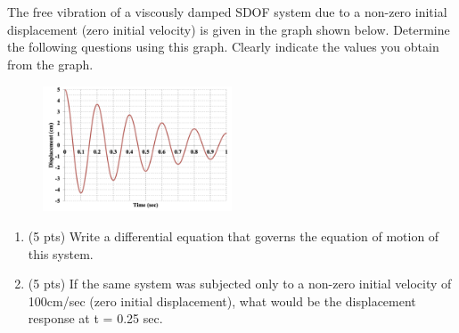 \section{}
The free vibration of a viscously damped SDOF system due to a non-zero initial 
displacement (zero initial velocity) is given in the graph shown below. Determine the 
following questions using this graph. Clearly indicate the values you obtain from the graph.

\begin{figure}[h]
\centering
\includegraphics[width=0.5\textwidth]{Questions/Figures/q1 Graph.png}
\end{figure}

\begin{enumerate}[label=(\alph*)]
    \item (5 pts) Write a differential equation that governs the equation of motion of this 
    system.
    \item (5 pts) If the same system was subjected only to a non-zero initial velocity of 
    100cm/sec (zero initial displacement), what would be the displacement response at 
    t = 0.25 sec.
\end{enumerate}

